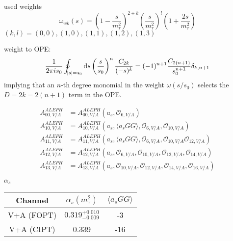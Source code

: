 \documentclass{article}
\begin{document}
  used weights
  \begin{equation}
    \omega_{wk}(s) = \left( 1 - \frac{s}{m_\tau^2} \right)^{2+k} \left( \frac{s}{m_\tau^2} \right)^l \left( 1 + \frac{2s}{m_\tau^2} \right)
  \end{equation}
  $(k,l) = {(0,0), (1,0), (1,1), (1,2), (1,3)}$

  weight to OPE:
  \begin{equation}
    \frac{1}{2 \pi i s_0} \oint_{\envert{s}=s_0} \dif s \left( \frac{s}{s_0} \right)^n \frac{C_{2k}}{(-s)^k} = (-1)^{n+1} \frac{C_{2(n+1)}}{s_0^{n+1}} \delta_{k,n+1}
  \end{equation}
  implying that an $n$-th degree monomial in the weight $\omega(s/s_0)$ selects
  the $D=2k=2(n+1)$ term in the OPE.

  \begin{equation}
    \begin{split}
      A_{00,V/A}^{ALEPH} &= A_{00,V/A}^{ALEPH}(a_s, \mathcal{O}_{6,V/A}) \\
      A_{10,V/A}^{ALEPH} &= A_{10,V/A}^{ALEPH}(a_s,\langle a_s GG \rangle, \mathcal{O}_{6,V/A}, \mathcal{O}_{10,V/A}) \\
      A_{11,V/A}^{ALEPH} &= A_{11,V/A}^{ALEPH}(a_s,\langle a_s GG \rangle, \mathcal{O}_{6,V/A}, \mathcal{O}_{10,V/A} \mathcal{O}_{12,V/A}) \\
      A_{12,V/A}^{ALEPH} &= A_{12,V/A}^{ALEPH}(a_s, \mathcal{O}_{6,V/A}, \mathcal{O}_{10,V/A}, \mathcal{O}_{12,V/A}, \mathcal{O}_{14,V/A}) \\
      A_{13,V/A}^{ALEPH} &= A_{13,V/A}^{ALEPH}(a_s, \mathcal{O}_{10,V/A}, \mathcal{O}_{12,V/A}, \mathcal{O}_{14,V/A}, \mathcal{O}_{16,V/A})
    \end{split} 
  \end{equation}

  $\alpha_s$
  \begin{center}
    \begin{tabular}{| c | c | c |}
      \hline
      Channel & $\alpha_s(m_\tau^2)$ & $\langle a_sGG \rangle$ \\ 
      \hline
      V+A (FOPT) & $0.319^{+0.010}_{-0.009}$ & -3 \\  
      \hline
      V+A (CIPT) & 0.339 & -16 \\    
      \hline
    \end{tabular}
  \end{center}
  
\end{document}
